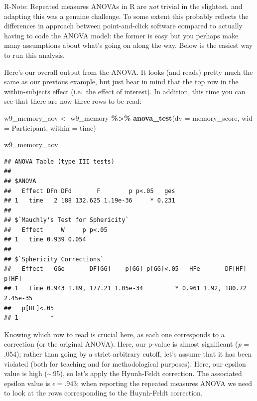 \documentclass[
]{book}
\newenvironment{Shaded}{\begin{snugshade}}{\end{snugshade}}
\newcommand{\AttributeTok}[1]{\textcolor[rgb]{0.13,0.29,0.53}{#1}}
\newcommand{\FunctionTok}[1]{\textcolor[rgb]{0.13,0.29,0.53}{\textbf{#1}}}
\newcommand{\NormalTok}[1]{#1}
\newcommand{\OtherTok}[1]{\textcolor[rgb]{0.56,0.35,0.01}{#1}}
\newcommand{\SpecialCharTok}[1]{\textcolor[rgb]{0.81,0.36,0.00}{\textbf{#1}}}
\begin{document}
R-Note: Repeated measures ANOVAs in R are \emph{not} trivial in the slightest, and adapting this was a genuine challenge. To some extent this probably reflects the differences in approach between
point-and-click software compared to actually having to code the ANOVA model: the former is easy but you perhaps make many assumptions about what's going on along the way. Below is the easiest way to run this analysis.

Here's our overall output from the ANOVA. It looks (and reads) pretty much the same as our previous example, but just bear in mind that the top row in the within-subjects effect (i.e.~the effect of interest). In addition, this time you can see that there are now three rows to be
read:

\begin{Shaded}
\begin{Highlighting}[]
\NormalTok{w9\_memory\_aov }\OtherTok{\textless{}{-}}\NormalTok{ w9\_memory }\SpecialCharTok{\%\textgreater{}\%}
  \FunctionTok{anova\_test}\NormalTok{(}\AttributeTok{dv =}\NormalTok{ memory\_score, }\AttributeTok{wid =}\NormalTok{ Participant, }\AttributeTok{within =}\NormalTok{ time) }

\NormalTok{w9\_memory\_aov}
\end{Highlighting}
\end{Shaded}

\begin{verbatim}
## ANOVA Table (type III tests)
## 
## $ANOVA
##   Effect DFn DFd       F        p p<.05   ges
## 1   time   2 188 132.625 1.19e-36     * 0.231
## 
## $`Mauchly's Test for Sphericity`
##   Effect     W     p p<.05
## 1   time 0.939 0.054      
## 
## $`Sphericity Corrections`
##   Effect   GGe       DF[GG]    p[GG] p[GG]<.05   HFe       DF[HF]    p[HF]
## 1   time 0.943 1.89, 177.21 1.05e-34         * 0.961 1.92, 180.72 2.45e-35
##   p[HF]<.05
## 1         *
\end{verbatim}

Knowing which row to read is crucial here, as each one corresponds to a correction (or the original ANOVA). Here, our p-value is almost significant (\emph{p} = .054); rather than going by a strict arbitrary cutoff, let's assume that it has been violated (both for teaching and for methodological purposes). Here, our epsilon value is high (\textasciitilde.95), so let's apply the Hyunh-Feldt correction. The associated epsilon value is \(\epsilon = .943\); when reporting the repeated measures ANOVA we need to look at the rows corresponding to the Huynh-Feldt correction.
\end{document}
